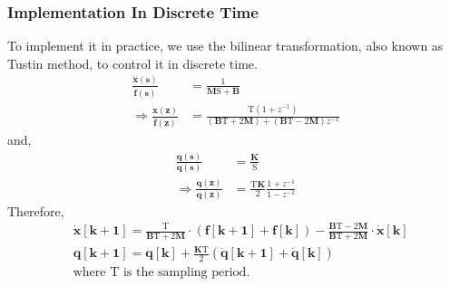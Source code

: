 \subsubsection{Implementation In Discrete Time}
\quad
To implement it in practice, we use the bilinear transformation, also known as Tustin method, to control it in discrete time.
\begin{equation}
\begin{split}
\frac{\boldsymbol{\dot{x}(s)}}{\boldsymbol{\dot{f}(s)}}
				&= \frac{1}{\mathbf{M}\mathrm{S}+\mathbf{B}}				\\
\Rightarrow 
\frac{\boldsymbol{\dot{x}(z)}}{\boldsymbol{\dot{f}(z)}}
				&= \frac{\mathrm{T}(1+z^{-1})}{(\mathbf{B}\mathrm{T}+2\mathbf{M})+(\mathbf{B}\mathrm{T}-2\mathbf{M})z^{-1}}
\end{split}
\end{equation}
\quad and,
\begin{equation}
\begin{split}
\frac{\boldsymbol{q(s)}}{\boldsymbol{\dot{q}(s)}}
				&= \frac{\mathbf{K}}{\mathrm{S}}				\\
\Rightarrow 
\frac{\boldsymbol{q(z)}}{\boldsymbol{\dot{q}(z)}}
				&= \frac{\mathrm{T}\mathbf{K}}{2}	
					\frac{1+z^{-1}}{1-z^{-1}}
\end{split}
\end{equation}
Therefore,
\begin{equation}
\begin{split}
&\boldsymbol{\dot{x}[k+1]} = \frac{\mathrm{T}}{\mathbf{B}\mathrm{T}+2\mathbf{M}}
							\cdot \left(	\boldsymbol{f[k+1]} + \boldsymbol{f[k]}		\right)
						 - \frac{\mathbf{B}\mathrm{T}-2\mathbf{M}}{\mathbf{B}\mathrm{T}+2\mathbf{M}}
						 	\cdot \boldsymbol{\dot{x}[k]}												\\
&\boldsymbol{q[k+1]} = \boldsymbol{q[k]} + \frac{\mathbf{K}\mathrm{T}}{2}
												\left( \boldsymbol{\dot{q}[k+1]} + \boldsymbol{\dot{q}[k]} \right)
\\
&\text{where } \mathrm{T} \text{ is the sampling period.												}
\end{split}
\end{equation}
